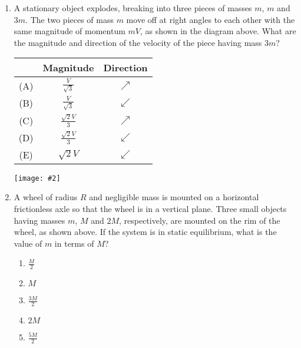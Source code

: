 \documentclass[11pt]{article}
\newcommand{\pic}[2]{\texttt{[image: \#2]}}
\begin{document}
\begin{multicols}{2}
\begin{enumerate}[leftmargin=18pt,resume]
    \begin{center}
    \end{center}
  \item A stationary object explodes, breaking into three pieces of masses $m$,
    $m$ and $3m$. The two pieces of mass $m$ move off at right angles to each
    other with the same magnitude of momentum $mV$, as shown in the diagram
    above. What are the magnitude and direction of the velocity of the piece
    having mass $3m$?

    \begin{tabular}{ccc}
      & Magnitude & Direction \\
      \hline
      (A) & $\displaystyle\frac{V}{\sqrt{3}}$ & $\nearrow$ \\
      (B) & $\displaystyle\frac{V}{\sqrt{3}}$ & $\swarrow$ \\
      (C) & $\displaystyle\frac{\sqrt{2}V}{3}$ & $\nearrow$ \\
      (D) & $\displaystyle\frac{\sqrt{2}V}{3}$ & $\swarrow$ \\
      (E) & $\displaystyle\sqrt{2}V$ & $\swarrow$ \\
    \end{tabular}

    \begin{center}
      \pic{.2}{rim}
    \end{center}
  \item A wheel of radius $R$ and negligible mass is mounted on a horizontal
    frictionless axle so that the wheel is in a vertical plane. Three small
    objects having masses $m$, $M$ and $2M$, respectively, are mounted on the
    rim of the wheel, as shown above. If the system is in static equilibrium,
    what is the value of $m$ in terms of $M$?
    \begin{enumerate}[noitemsep,topsep=0pt,leftmargin=18pt,label=(\Alph*)]
    \item$\displaystyle\frac{M}{2}$
    \item$M$
    \item$\displaystyle\frac{3M}{2}$
    \item$2M$
    \item$\displaystyle\frac{5M}{2}$
    \end{enumerate}


\end{enumerate}
\end{multicols}
\end{document}
